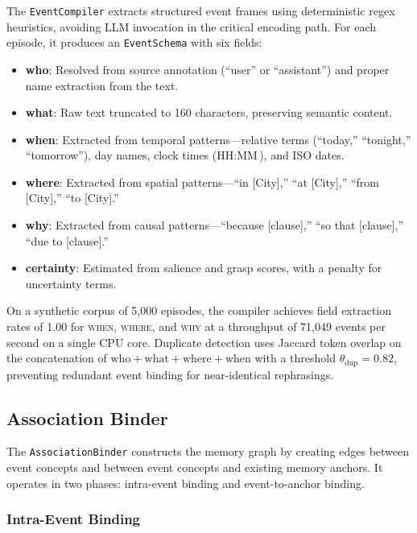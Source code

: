 \documentclass[11pt,twocolumn]{article}
\begin{document}
The \texttt{EventCompiler} extracts structured event frames using deterministic regex heuristics, avoiding LLM invocation in the critical encoding path. For each episode, it produces an \texttt{EventSchema} with six fields:

\begin{itemize}
\item \textbf{who}: Resolved from source annotation (``user'' or ``assistant'') and proper name extraction from the text.
\item \textbf{what}: Raw text truncated to 160 characters, preserving semantic content.
\item \textbf{when}: Extracted from temporal patterns---relative terms (``today,'' ``tonight,'' ``tomorrow''), day names, clock times ($\text{HH}:\text{MM}$), and ISO dates.
\item \textbf{where}: Extracted from spatial patterns---``in [City],'' ``at [City],'' ``from [City],'' ``to [City].''
\item \textbf{why}: Extracted from causal patterns---``because [clause],'' ``so that [clause],'' ``due to [clause].''
\item \textbf{certainty}: Estimated from salience and grasp scores, with a penalty for uncertainty terms.
\end{itemize}

On a synthetic corpus of 5,000 episodes, the compiler achieves field extraction rates of 1.00 for \textsc{when}, \textsc{where}, and \textsc{why} at a throughput of 71,049 events per second on a single CPU core. Duplicate detection uses Jaccard token overlap on the concatenation of $\text{who} + \text{what} + \text{where} + \text{when}$ with a threshold $\theta_{\text{dup}} = 0.82$, preventing redundant event binding for near-identical rephrasings.

\subsection{Association Binder}

The \texttt{AssociationBinder} constructs the memory graph by creating edges between event concepts and between event concepts and existing memory anchors. It operates in two phases: intra-event binding and event-to-anchor binding.

\subsubsection{Intra-Event Binding}
\end{document}
